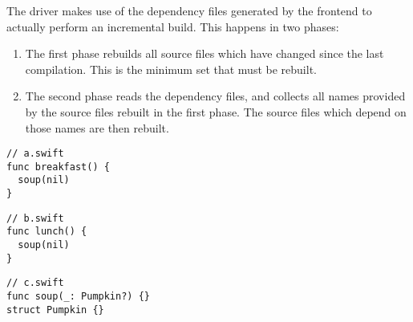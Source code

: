 \documentclass[../generics]{subfiles}
\begin{document}
The driver makes use of the dependency files generated by the frontend to actually perform an incremental build. This happens in two phases:
\begin{enumerate}
\item The first phase rebuilds all source files which have changed since the last compilation. This is the minimum set that must be rebuilt.
\item The second phase reads the dependency files, and collects all names provided by the source files rebuilt in the first phase. The source files which depend on those names are then rebuilt.
\end{enumerate}

\begin{listing}[b!]\label{dependencyexample}
\begin{Verbatim}
// a.swift
func breakfast() {
  soup(nil)
}
\end{Verbatim}
\begin{Verbatim}
// b.swift
func lunch() {
  soup(nil)
}
\end{Verbatim}
\begin{Verbatim}
// c.swift
func soup(_: Pumpkin?) {}
struct Pumpkin {}
\end{Verbatim}
\end{listing}
\end{document}

